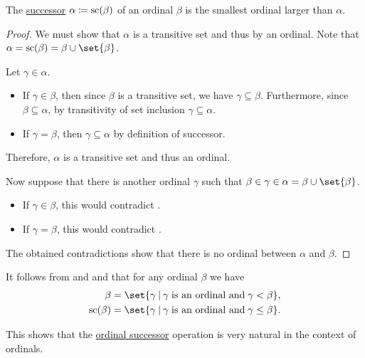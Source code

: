 \begin{proposition}\label{thm:successor_of_ordinal}
  The \hyperref[def:ordinal_successor]{successor} \( \alpha \coloneqq \op{sc}(\beta) \) of an ordinal \( \beta \) is the smallest ordinal larger than \( \alpha \).
\end{proposition}
\begin{proof}
  We must show that \( \alpha \) is a transitive set and thus by  an ordinal. Note that \( \alpha = \op{sc}(\beta) = \beta \cup \set{ \beta } \).

  Let \( \gamma \in \alpha \).
  \begin{itemize}
    \item If \( \gamma \in \beta \), then since \( \beta \) is a transitive set, we have \( \gamma \subseteq \beta \). Furthermore, since \( \beta \subseteq \alpha \), by transitivity of set inclusion \( \gamma \subseteq \alpha \).

    \item If \( \gamma = \beta \), then \( \gamma \subseteq \alpha \) by definition of successor.
  \end{itemize}

  Therefore, \( \alpha \) is a transitive set and thus an ordinal.

  Now suppose that there is another ordinal \( \gamma \) such that \( \beta \in \gamma \in \alpha = \beta \cup \set{ \beta } \).
  \begin{itemize}
    \item If \( \gamma \in \beta \), this would contradict .

    \item If \( \gamma = \beta \), this would contradict .
  \end{itemize}

  The obtained contradictions show that there is no ordinal between \( \alpha \) and \( \beta \).
\end{proof}

\begin{remark}\label{rem:def:ordinal_successor}
  It follows from  and  and that for any ordinal \( \beta \) we have
  \begin{align*}
    \beta            &= \set{ \gamma \given \gamma \T{is an ordinal and} \gamma < \beta }, \\
    \op{sc}(\beta) &= \set{ \gamma \given \gamma \T{is an ordinal and} \gamma \leq \beta }.
  \end{align*}

  This shows that the \hyperref[def:ordinal_successor]{ordinal successor} operation is very natural in the context of ordinals.
\end{remark}

